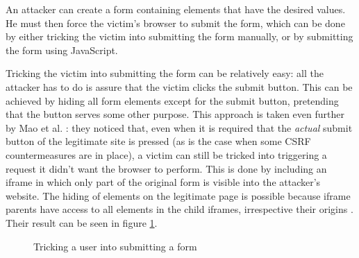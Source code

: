 An attacker can create a form containing elements that have the desired values. He must then force the victim's browser to submit the form, which can be done by either tricking the victim into submitting the form manually, or by submitting the form using JavaScript.

Tricking the victim into submitting the form can be relatively easy: all the attacker has to do is assure that the victim clicks the submit button. This can be achieved by hiding all form elements except for the submit button, pretending that the button serves some other purpose. This approach is taken even further by Mao et al. \cite{Mao2009}: they noticed that, even when it is required that the \emph{actual} submit button of the legitimate site is pressed (as is the case when some CSRF countermeasures \cite{Jovanovic2006,Johns2006} are in place), a victim can still be tricked into triggering a request it didn't want the browser to perform. This is done by including an iframe in which only part of the original form is visible into the attacker's website. The hiding of elements on the legitimate page is possible because iframe parents have access to all elements in the child iframes, irrespective their origins \cite{Singh2010}. Their result can be seen in figure \ref{fig:mao2009}.

\begin{figure}[ht]
	\centering
	\caption{Tricking a user into submitting a form \cite{Mao2009}}
	\label{fig:mao2009}
\end{figure}

